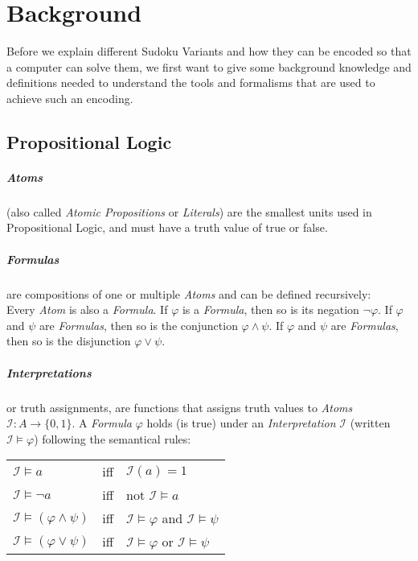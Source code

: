 \newtheorem{definition}{Definition}



\chapter{Background}
Before we explain different Sudoku Variants and how they can be encoded so that a computer can solve them, we first want to give some background knowledge and definitions needed to understand the tools and formalisms that are used to achieve such an encoding.

\section{Propositional Logic}

\paragraph{Atoms}
(also called \emph{Atomic Propositions} or \emph{Literals}) are the smallest units used in Propositional Logic, and must have a truth value of true or false.


\paragraph{Formulas} are compositions of one or multiple \emph{Atoms} and can be defined recursively:\\
Every \emph{Atom} is also a \emph{Formula}.
If $\varphi$ is a \emph{Formula}, then so is its negation $\neg\varphi$.
If $\varphi$ and $\psi$ are \emph{Formulas}, then so is the conjunction $\varphi \land \psi$.
If $\varphi$ and $\psi$ are \emph{Formulas}, then so is the disjunction $\varphi \lor \psi$.


\paragraph{Interpretations} or truth assignments, are functions that assigns truth values to \emph{Atoms} $\mathcal{I}: A \rightarrow \{0,1\}$. A \emph{Formula} $\varphi$ holds (is true) under an \emph{Interpretation} $\mathcal{I}$ (written $\mathcal{I} \models \varphi$) following the semantical rules:
\begin{center}
    \begin{tabular}{ l l l }
    $\mathcal{I} \models a$ & iff & $\mathcal{I}(a) = 1$\\
    $\mathcal{I} \models \neg a$ & iff & not $\mathcal{I} \models a$\\
    $\mathcal{I} \models (\varphi \land \psi)$ & iff & $\mathcal{I} \models \varphi$ and $\mathcal{I} \models \psi$\\
    $\mathcal{I} \models (\varphi \lor \psi)$ & iff & $\mathcal{I} \models \varphi$ or $\mathcal{I} \models \psi$\\
\end{tabular}
\end{center}

